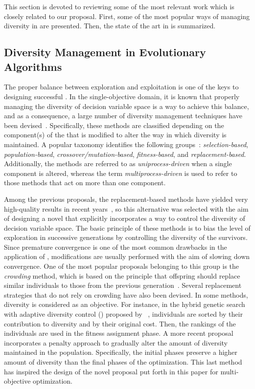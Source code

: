 This section is devoted to reviewing some of the most relevant work which is closely related to our proposal.
%
First, some of the most popular ways of managing diversity in \EAS{} are presented.
%
Then, the state of the art in \MOEAS{} is summarized.

\subsection{Diversity Management in Evolutionary Algorithms}

The proper balance between exploration and exploitation is one of the keys to designing successful \EAS{}.
%
In the single-objective domain, it is known that properly managing the diversity of decision 
variable space is a way to achieve this balance,
and as a consequence, a large number of diversity management techniques have been devised~\citep{Mohan:14}.
%
Specifically, these methods are classified depending on the component(s) of the \EA{} that is modified to alter the way in which 
diversity is maintained.
%
A popular taxonomy identifies the following groups~\citep{Joel:Crepinsek}: \textit{selection-based}, \textit{population-based}, 
\textit{crossover/mutation-based}, \textit{fitness-based}, and \textit{replacement-based}.
%
Additionally, the methods are referred to as \textit{uniprocess-driven} when a single component is altered, whereas the term
\textit{multiprocess-driven} is used to refer to those methods that act on more than one component.

Among the previous proposals, the replacement-based methods have yielded very high-quality results in recent years~\citep{Segura:17}, so
this alternative was selected with the aim of designing a novel \MOEA{} that explicitly incorporates a way to control the diversity 
of decision variable space.
%
The basic principle of these methods is to bias the level of exploration in successive generations by 
controlling the diversity of the survivors.%
%
Since premature convergence is one of the most common drawbacks in the application of \EAS{}, 
modifications are usually performed with the aim of slowing down convergence.
%
One of the most popular proposals belonging to this group is the \textit{crowding} method, which
is based on the principle that offspring should replace similar individuals to those from the previous generation~\citep{Mengshoel:14}.
%
Several replacement strategies that do not rely on crowding have also been devised.
%
In some methods, diversity is considered as an objective.
%
For instance, in the hybrid genetic search with adaptive diversity control (\HGSADC{}) proposed by ~\cite{Vidal:13}, individuals are sorted 
by their contribution to diversity and by their original cost.
%
Then, the rankings of the individuals are used in the fitness assignment phase.
%
A more recent proposal~\citep{Segura:17} incorporates a penalty approach to gradually alter the amount of diversity 
maintained in the population.
%
Specifically, the initial phases preserve a higher amount of diversity than the final phases of the optimization.
%
This last method has inspired the design of the novel proposal put forth in this paper for multi-objective optimization.
%

